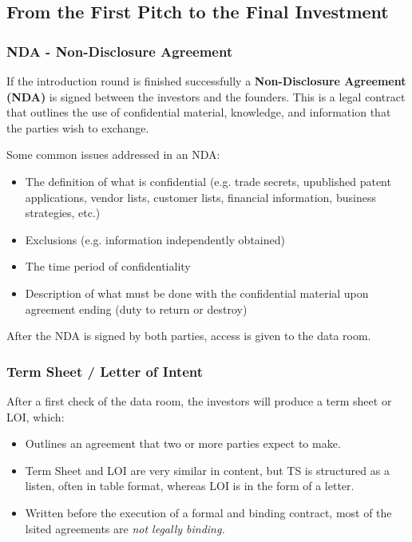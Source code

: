 \documentclass[a4paper]{extarticle}
\begin{document}
\subsection{From the First Pitch to the Final Investment}

\subsubsection{NDA - Non-Disclosure Agreement}

If the introduction round is finished successfully a \textbf{Non-Disclosure Agreement (NDA)} is signed between the investors and the founders. This is a legal contract that outlines the use of confidential material, knowledge, and information that the parties wish to exchange.

Some common issues addressed in an NDA:

\begin{itemize}
    \item The definition of what is confidential (e.g. trade secrets, upublished patent applications, vendor lists, customer lists, financial information, business strategies, etc.)
    \item Exclusions (e.g. information independently obtained)
    \item The time period of confidentiality
    \item Description of what must be done with the confidential material upon agreement ending (duty to return or destroy)
\end{itemize}

After the NDA is signed by both parties, access is given to the data room.

\subsubsection{Term Sheet / Letter of Intent}

After a first check of the data room, the investors will produce a term sheet or LOI, which:

\begin{itemize}
    \item Outlines an agreement that two or more parties expect to make.
    \item Term Sheet and LOI are very similar in content, but TS is structured as a listen, often in table format, whereas LOI is in the form of a letter.
    \item Written before the execution of a formal and binding contract, most of the lsited agreements are \textit{not legally binding.}
\end{itemize}
\end{document}
